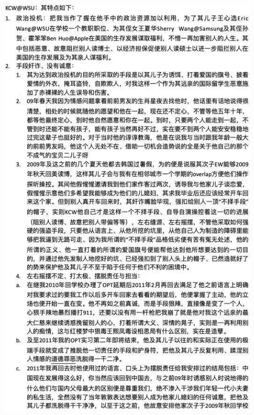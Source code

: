\documentclass[9pt, b5paper]{article}
\begin{document}
\includegraphics[width=.9\linewidth]{./pic/1.jpg}
\end{document}

